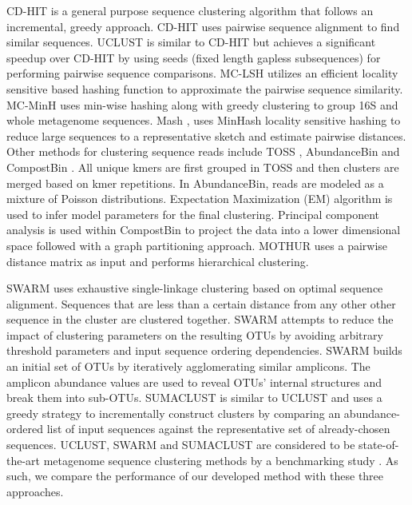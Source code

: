 \documentclass[10pt, conference, compsocconf]{IEEEtran}
\begin{document}
CD-HIT \cite{MARCDhit} is a 
general purpose sequence clustering algorithm that 
follows an incremental, greedy approach. CD-HIT uses 
pairwise sequence alignment to find similar 
sequences. UCLUST \cite{MARuclust} is similar to CD-HIT but 
achieves a significant speedup over CD-HIT by using seeds (fixed length gapless subsequences) for 
performing pairwise sequence comparisons. MC-LSH \cite{MARMetaLSH} utilizes 
an efficient locality sensitive based hashing function to 
approximate the pairwise sequence similarity. MC-MinH \cite{MARMcMinH} uses 
min-wise \cite{MARMinWise} hashing along with 
greedy clustering to group 16S and whole metagenome sequences. Mash \cite{MAROtherMinH}, uses MinHash 
locality sensitive hashing 
to reduce large sequences to a representative sketch and 
estimate
pairwise distances. Other methods for clustering sequence 
reads include TOSS \cite{MARToss}, AbundanceBin \cite{MARAbundant} and CompostBin \cite{MARCompost}. All unique 
kmers are first grouped in TOSS and then clusters are merged 
based on kmer repetitions. In AbundanceBin, reads are modeled as a 
mixture of Poisson distributions. Expectation Maximization (EM) algorithm 
is used to infer model parameters for the final clustering. Principal 
component analysis is used within CompostBin to project the data into a 
lower dimensional space
followed with a graph partitioning approach. MOTHUR \cite{MARMothur} uses a pairwise distance matrix as 
input and performs hierarchical clustering. 

%
SWARM \cite{MARSwarm2} uses exhaustive single-linkage clustering 
based on optimal sequence alignment. Sequences that are less than 
a certain distance from any other other sequence in the cluster are 
clustered together. SWARM attempts to reduce the impact of clustering 
parameters on the resulting OTUs by avoiding arbitrary 
threshold parameters 
and input sequence ordering dependencies. SWARM builds 
an initial set of OTUs  by 
iteratively agglomerating similar amplicons. The amplicon abundance values are used to reveal 
OTUs’ internal structures and 
break them into sub-OTUs.
%
SUMACLUST \cite{MARSumaclust} is similar to UCLUST and uses 
a  greedy strategy to 
incrementally construct clusters by comparing an 
abundance-ordered list of input sequences against the 
representative set of already-chosen sequences.  UCLUST, SWARM and SUMACLUST are 
considered to be 
state-of-the-art metagenome sequence clustering methods by a 
benchmarking study \cite{MARopenDeNovo}.  As such, we compare the performance of our developed method with these three approaches. 
\end{document}
